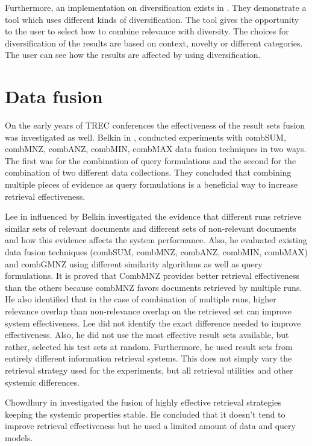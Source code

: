 Furthermore, an implementation on diversification exists in \cite{DrosouPitoura}. They demonstrate a tool which uses different kinds of diversification. The tool gives the opportunity to the user to select how to combine relevance with diversity. The choices for diversification of the results are based on context, novelty or different categories. The user can see how the results are affected by using diversification.


\section{Data fusion}
On the early years of TREC conferences the effectiveness of the result sets fusion was investigated as well. Belkin in \cite{Belkin}, conducted experiments with combSUM, combMNZ, combANZ, combMIN, combMAX data fusion techniques in two ways. The first was for the combination of query formulations and the second for the combination of two different data collections. They concluded that combining multiple pieces of evidence as query formulations is a beneficial way to increase retrieval effectiveness.

Lee in \cite{Lee} influenced by Belkin investigated the evidence that different runs retrieve similar sets of relevant documents and different sets of non-relevant documents and how this evidence affects the system performance. Also, he evaluated existing data fusion techniques (combSUM, combMNZ, combANZ, combMIN, combMAX) and combGMNZ using different similarity algorithms as well as query formulations. It is proved that CombMNZ provides better retrieval effectiveness than the others because combMNZ favors documents retrieved by multiple runs. He also identified that in the case of combination of multiple runs, higher relevance overlap than non-relevance overlap on the retrieved set can improve system effectiveness. Lee did not identify the exact difference needed to improve effectiveness. Also, he did not use the most effective result sets available, but rather, selected his test sets at random. Furthermore, he used result sets from entirely different information retrieval systems. This does not simply vary the retrieval strategy used for the experiments, but all retrieval utilities and other systemic differences.

Chowdhury in \cite{Chowdhury} investigated the fusion of highly effective retrieval strategies keeping the systemic properties stable. He concluded that it doesn't tend to improve retrieval effectiveness but he used a limited amount of data and query models.

